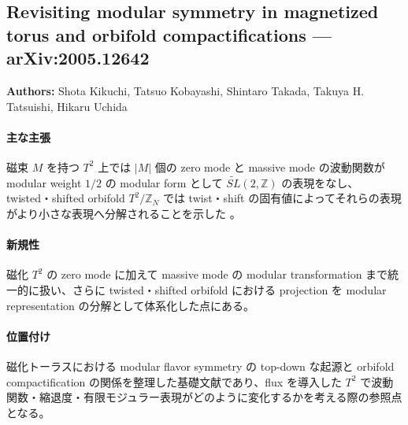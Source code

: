 \subsection{Revisiting modular symmetry in magnetized torus and orbifold compactifications --- arXiv:2005.12642}

\textbf{Authors:} Shota Kikuchi, Tatsuo Kobayashi, Shintaro Takada, Takuya H. Tatsuishi, Hikaru Uchida

\paragraph{主な主張}
磁束 $M$ を持つ $T^2$ 上では $|M|$ 個の zero mode と massive mode の波動関数が modular weight $1/2$ の modular form として $\widetilde{SL}(2,\mathbb{Z})$ の表現をなし、twisted・shifted orbifold $T^2/\mathbb{Z}_N$ では twist・shift の固有値によってそれらの表現がより小さな表現へ分解されることを示した \cite{Kikuchi:2020magnetized}。

\paragraph{新規性}
磁化 $T^2$ の zero mode に加えて massive mode の modular transformation まで統一的に扱い、さらに twisted・shifted orbifold における projection を modular representation の分解として体系化した点にある。

\paragraph{位置付け}
磁化トーラスにおける modular flavor symmetry の top-down な起源と orbifold compactification の関係を整理した基礎文献であり、flux を導入した $T^2$ で波動関数・縮退度・有限モジュラー表現がどのように変化するかを考える際の参照点となる。
